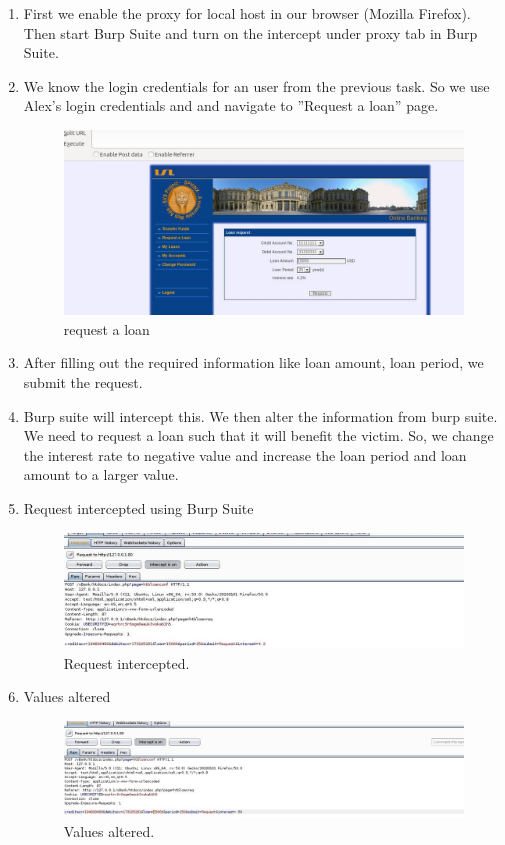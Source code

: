 \documentclass[12pt]{report}
\begin{document}
	
	\begin{enumerate}
		\item First we enable the proxy for local host in our browser (Mozilla Firefox). Then start Burp Suite and turn on the intercept under proxy tab in Burp Suite.
		\item We know the login credentials for an user from the previous task. So we use Alex's login credentials and and navigate to ''Request a loan'' page.
		\begin{figure}[H]
			\includegraphics[width=0.75\textheight]{images/1_2reqloan.jpg}
			\caption{request a loan}
			
		\end{figure}
		\item After filling out the required information like loan amount, loan period, we submit the request.
		\item Burp suite will intercept this. We then alter the information from burp suite. We need to request a loan such that it will benefit the victim. So, we change the interest rate to  negative value and increase the loan period and loan amount to a larger value.
		
		
		\item Request intercepted using Burp Suite
		\begin{figure}[H]
			\includegraphics[width=0.75\textheight]{images/1_2reqintrcpt.jpg}
			\caption{Request intercepted.}
			
		\end{figure}
		\item Values altered
		\begin{figure}[H]
			\includegraphics[width=0.75\textheight]{images/1_2valuesaltered.jpg}
			\caption{Values altered.}
			

\end{figure}
\end{enumerate}
\end{document}
